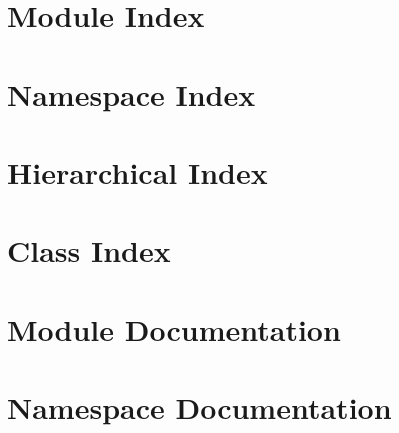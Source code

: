 \let\mypdfximage\pdfximage\def\pdfximage{\immediate\mypdfximage}\documentclass[twoside]{book}
\newcommand{\+}{\discretionary{\mbox{\scriptsize$\hookleftarrow$}}{}{}}
\begin{document}
\chapter{Module Index}

\chapter{Namespace Index}

\chapter{Hierarchical Index}

\chapter{Class Index}

\chapter{Module Documentation}















\chapter{Namespace Documentation}



















\end{document}
